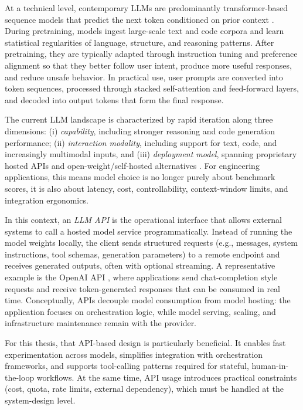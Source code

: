 At a technical level, contemporary LLMs are predominantly transformer-based sequence models that predict the next token conditioned on prior context \cite{vaswani2023attentionneed}. During pretraining, models ingest large-scale text and code corpora and learn statistical regularities of language, structure, and reasoning patterns. After pretraining, they are typically adapted through instruction tuning \cite{zhang2025instructiontuninglargelanguage} and preference alignment so that they better follow user intent, produce more useful responses, and reduce unsafe behavior. In practical use, user prompts are converted into token sequences, processed through stacked self-attention and feed-forward layers, and decoded into output tokens that form the final response.

The current LLM landscape is characterized by rapid iteration along three dimensions: (i) \emph{capability}, including stronger reasoning and code generation performance; (ii) \emph{interaction modality}, including support for text, code, and increasingly multimodal inputs, and (iii) \emph{deployment model}, spanning proprietary hosted APIs and open-weight/self-hosted alternatives \cite{Jiang_2026, yang2025codefoundationmodelsagents, zhao2026surveylargelanguagemodels}. For engineering applications, this means model choice is no longer purely about benchmark scores, it is also about latency, cost, controllability, context-window limits, and integration ergonomics.

In this context, an \emph{LLM API} is the operational interface that allows external systems to call a hosted model service programmatically. Instead of running the model weights locally, the client sends structured requests (e.g., messages, system instructions, tool schemas, generation parameters) to a remote endpoint and receives generated outputs, often with optional streaming. A representative example is the OpenAI API \cite{openaiPlatform}, where applications send chat-completion style requests and receive token-generated responses that can be consumed in real time. Conceptually, APIs decouple model consumption from model hosting: the application focuses on orchestration logic, while model serving, scaling, and infrastructure maintenance remain with the provider.

For this thesis, that API-based design is particularly beneficial. It enables fast experimentation across models, simplifies integration with orchestration frameworks, and supports tool-calling patterns required for stateful, human-in-the-loop workflows. At the same time, API usage introduces practical constraints (cost, quota, rate limits, external dependency), which must be handled at the system-design level.

